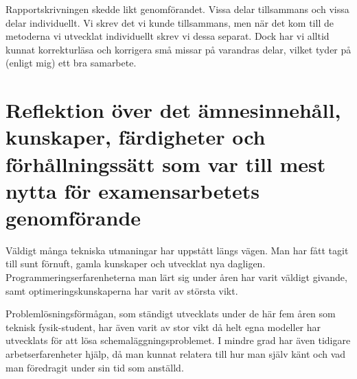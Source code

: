 \documentclass{article}
\begin{document}
Rapportskrivningen skedde likt genomförandet. Vissa delar tillsammans och vissa delar individuellt. Vi skrev det vi kunde tillsammans, men när det kom till de metoderna vi utvecklat individuellt skrev vi dessa separat. Dock har vi alltid kunnat korrekturläsa och korrigera små missar på varandras delar, vilket tyder på (enligt mig) ett bra samarbete.

\section*{Reflektion över det ämnesinnehåll, kunskaper, färdigheter och förhållningssätt som var till mest nytta för examensarbetets genomförande}
Väldigt många tekniska utmaningar har uppstått längs vägen. Man har fått tagit till sunt förnuft, gamla kunskaper och utvecklat nya dagligen. Programmeringserfarenheterna man lärt sig under åren har varit väldigt givande, samt optimeringskunskaperna har varit av största vikt.

Problemlösningsförmågan, som ständigt utvecklats under de här fem åren som teknisk fysik-student, har även varit av stor vikt då helt egna modeller har utvecklats för att lösa schemaläggningsproblemet. I mindre grad har även tidigare arbetserfarenheter hjälp, då man kunnat relatera till hur man själv känt och vad man föredragit under sin tid som anställd. 
\end{document}
